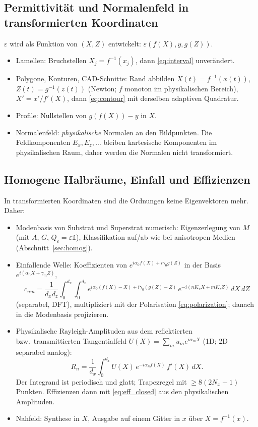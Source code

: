 \subsection{Permittivität und Normalenfeld in transformierten Koordinaten}
$\varepsilon$ wird als Funktion von $(X,Z)$ entwickelt: $\varepsilon(f(X),y,g(Z))$.
\begin{itemize}[nosep]
  \item Lamellen: Bruchstellen $X_j=f^{-1}(x_j)$, dann \eqref{eq:interval} unverändert.
  \item Polygone, Konturen, CAD-Schnitte: Rand abbilden $X(t)=f^{-1}(x(t))$, $Z(t)=g^{-1}(z(t))$ (Newton; $f$ monoton im
        physikalischen Bereich), $X'=x'/f'(X)$, dann \eqref{eq:contour} mit derselben adaptiven Quadratur.
  \item Profile: Nullstellen von $g(f(X))-y$ in $X$.
  \item Normalenfeld: \emph{physikalische} Normalen an den Bildpunkten. Die Feldkomponenten $E_x,E_z,\dots$ bleiben
        kartesische Komponenten im physikalischen Raum, daher werden die Normalen nicht transformiert.
\end{itemize}

\subsection{Homogene Halbräume, Einfall und Effizienzen}
In transformierten Koordinaten sind die Ordnungen keine Eigenvektoren mehr. Daher:
\begin{itemize}[nosep]
  \item Modenbasis von Substrat und Superstrat numerisch: Eigenzerlegung von $M$ (mit $A$, $G$, $Q_{\varepsilon}=\varepsilon\mathbb 1$),
        Klassifikation auf/ab wie bei anisotropen Medien (Abschnitt~\ref{sec:homog}).
  \item Einfallende Welle: Koeffizienten von $e^{i\alpha_0f(X)+i\gamma_0g(Z)}$ in der Basis $e^{i(\alpha_nX+\gamma_mZ)}$,
        \begin{equation}
          c_{nm}=\frac{1}{d_xd_z}\int_0^{d_x}\!\!\int_0^{d_z}e^{i\alpha_0(f(X)-X)+i\gamma_0(g(Z)-Z)}\,e^{-i(nK_xX+mK_zZ)}\,dX\,dZ
          \label{eq:ct_inc}
        \end{equation}
        (separabel, DFT), multipliziert mit der Polarisation \eqref{eq:polarization}; danach in die Modenbasis projizieren.
  \item Physikalische Rayleigh-Amplituden aus dem reflektierten bzw.\ transmittierten Tangentialfeld $U(X)=\sum_mu_me^{i\alpha_mX}$
        (1D; 2D separabel analog):
        \begin{equation}
          R_n=\frac{1}{d_x}\int_0^{d_x}U(X)\,e^{-i\alpha_nf(X)}\,f'(X)\,dX .
          \label{eq:ct_rayleigh}
        \end{equation}
        Der Integrand ist periodisch und glatt; Trapezregel mit $\ge8(2N_x+1)$ Punkten. Effizienzen dann mit
        \eqref{eq:eff_closed} aus den physikalischen Amplituden.
  \item Nahfeld: Synthese in $X$, Ausgabe auf einem Gitter in $x$ über $X=f^{-1}(x)$.
\end{itemize}

